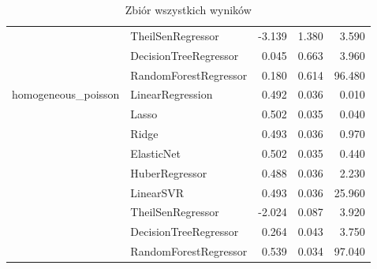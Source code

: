\begin{table}[]
{\begin{tabular}{llrrr}
 & TheilSenRegressor & -3.139 & 1.380 & 3.590 \\
 & DecisionTreeRegressor & 0.045 & 0.663 & 3.960 \\
 & RandomForestRegressor & 0.180 & 0.614 & 96.480 \\
\cline{1-5}
\multirow[t]{9}{*}{homogeneous\_poisson} & LinearRegression & 0.492 & 0.036 & 0.010 \\
 & Lasso & 0.502 & 0.035 & 0.040 \\
 & Ridge & 0.493 & 0.036 & 0.970 \\
 & ElasticNet & 0.502 & 0.035 & 0.440 \\
 & HuberRegressor & 0.488 & 0.036 & 2.230 \\
 & LinearSVR & 0.493 & 0.036 & 25.960 \\
 & TheilSenRegressor & -2.024 & 0.087 & 3.920 \\
 & DecisionTreeRegressor & 0.264 & 0.043 & 3.750 \\
 & RandomForestRegressor & 0.539 & 0.034 & 97.040 \\
\cline{1-5}
\bottomrule
\end{tabular}


    }

 \caption{Zbiór wszystkich wyników}
    
\end{table}